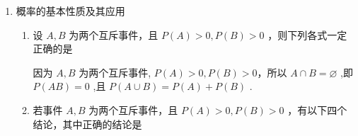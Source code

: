 \begin{enumerate}
\begin{enumerate}
        \item 甲、乙两人对同一个靶各射击一次，设事件 $A =$ “甲击中靶”，事件 $B =$ “乙击中靶”，事件 $E =$ “靶未被击中”，事件 $F =$ “靶被击中”，事件 $G =$ “恰一人击中靶”，对下列关系式 ( $\bar{A}$ 表示 $A$ 的对立事件, $\bar{B}$ 表示 $B$ 的对立事件)正确的是
    \end{enumerate}
    
    \item 概率的基本性质及其应用
    \begin{enumerate}
        \item 设 $A,B$ 为两个互斥事件，且 $P\left( A\right)  > 0,P\left( B\right)  > 0$ ，则下列各式一定正确的是
        \begin{jieda}
            因为 $A,B$ 为两个互斥事件, $P\left( A\right)  > 0,P\left( B\right)  > 0$，所以 $A \cap  B = \varnothing$ ,即 $P\left( {AB}\right)  = 0$ ,且 $P\left( {A \cup  B}\right)  = P\left( A\right)  + P\left( B\right)$ .
        \end{jieda}

        \item 若事件 $A,B$ 为两个互斥事件，且 $P\left( A\right)  > 0,P\left( B\right)  > 0$ ，有以下四个结论，其中正确的结论是
        

\end{enumerate}
\end{enumerate}
